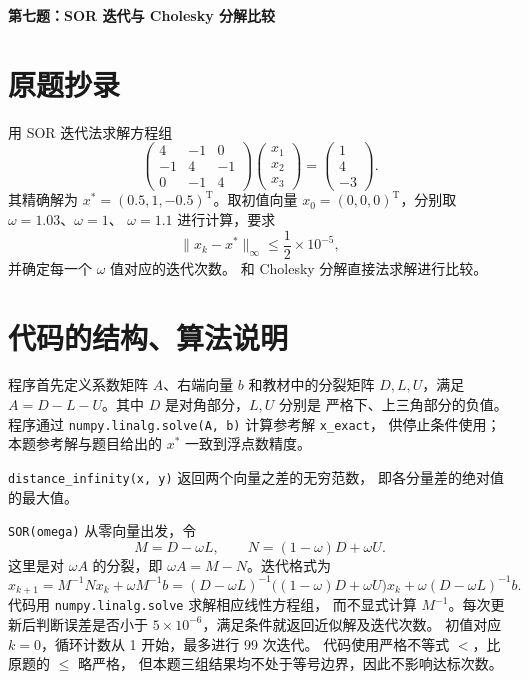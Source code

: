 \documentclass[UTF8,a4paper,11pt,fontset=fandol]{ctexart}
\begin{document}
\pagestyle{plain}

\begin{center}
  {\Large\bfseries 第七题：SOR 迭代与 Cholesky 分解比较}
\end{center}

\section{原题抄录}

用 SOR 迭代法求解方程组
\[
\begin{pmatrix}
4&-1&0\\
-1&4&-1\\
0&-1&4
\end{pmatrix}
\begin{pmatrix}x_1\\x_2\\x_3\end{pmatrix}
=\begin{pmatrix}1\\4\\-3\end{pmatrix}.
\]
其精确解为 $x^*=(0.5,1,-0.5)^{\mathrm T}$。取初值向量
$x_0=(0,0,0)^{\mathrm T}$，分别取 $\omega=1.03$、$\omega=1$、
$\omega=1.1$ 进行计算，要求
\[
\|x_k-x^*\|_\infty\leq\frac12\times10^{-5},
\]
并确定每一个 $\omega$ 值对应的迭代次数。
和 Cholesky 分解直接法求解进行比较。

\section{代码的结构、算法说明}

程序首先定义系数矩阵 $A$、右端向量 $b$ 和教材中的分裂矩阵
$D,L,U$，满足 $A=D-L-U$。其中 $D$ 是对角部分，$L,U$ 分别是
严格下、上三角部分的负值。程序通过
\texttt{numpy.linalg.solve(A, b)} 计算参考解 \texttt{x\_exact}，
供停止条件使用；本题参考解与题目给出的 $x^*$ 一致到浮点数精度。

\texttt{distance\_infinity(x, y)} 返回两个向量之差的无穷范数，
即各分量差的绝对值的最大值。

\texttt{SOR(omega)} 从零向量出发，令
\[
M=D-\omega L,\qquad N=(1-\omega)D+\omega U.
\]
这里是对 $\omega A$ 的分裂，即 $\omega A=M-N$。迭代格式为
\[
x_{k+1}=M^{-1}Nx_k+\omega M^{-1}b
=(D-\omega L)^{-1}\bigl((1-\omega)D+\omega U\bigr)x_k
+\omega(D-\omega L)^{-1}b.
\]
代码用 \texttt{numpy.linalg.solve} 求解相应线性方程组，
而不显式计算 $M^{-1}$。每次更新后判断误差是否小于
$5\times10^{-6}$，满足条件就返回近似解及迭代次数。
初值对应 $k=0$，循环计数从 1 开始，最多进行 99 次迭代。
代码使用严格不等式 $<$，比原题的 $\leq$ 略严格，
但本题三组结果均不处于等号边界，因此不影响达标次数。
\end{document}
